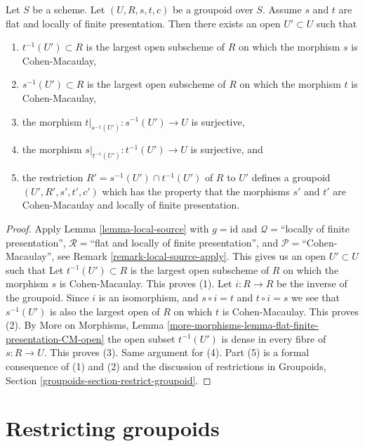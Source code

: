 \begin{lemma}
\label{lemma-make-CM}
Let $S$ be a scheme.
Let $(U, R, s, t, c)$ be a groupoid over $S$.
Assume $s$ and $t$ are flat and locally of finite presentation.
Then there exists an open $U' \subset U$ such that
\begin{enumerate}
\item $t^{-1}(U') \subset R$ is the largest open subscheme of
$R$ on which the morphism $s$ is Cohen-Macaulay,
\item $s^{-1}(U') \subset R$ is the largest open subscheme of
$R$ on which the morphism $t$ is Cohen-Macaulay,
\item the morphism $t|_{s^{-1}(U')} : s^{-1}(U') \to U$ is
surjective,
\item the morphism $s|_{t^{-1}(U')} : t^{-1}(U') \to U$ is
surjective, and
\item the restriction $R' = s^{-1}(U') \cap t^{-1}(U')$
of $R$ to $U'$ defines a groupoid $(U', R', s', t', c')$ which has the property
that the morphisms $s'$ and $t'$ are Cohen-Macaulay and locally of
finite presentation.
\end{enumerate}
\end{lemma}

\begin{proof}
Apply
Lemma \ref{lemma-local-source}
with
$g = \text{id}$ and
$\mathcal{Q} =$``locally of finite presentation'',
$\mathcal{R} =$``flat and locally of finite presentation'', and
$\mathcal{P}=$``Cohen-Macaulay'', see
Remark \ref{remark-local-source-apply}.
This gives us an open $U' \subset U$ such that
Let $t^{-1}(U') \subset R$ is the largest open subscheme of $R$
on which the morphism $s$ is Cohen-Macaulay.
This proves (1).
Let $i : R \to R$ be the inverse of the groupoid.
Since $i$ is an isomorphism, and $s \circ i = t$ and $t \circ i = s$
we see that $s^{-1}(U')$ is also the largest open of $R$ on which $t$ is
Cohen-Macaulay. This proves (2).
By 
More on Morphisms,
Lemma \ref{more-morphisms-lemma-flat-finite-presentation-CM-open}
the open subset $t^{-1}(U')$ is dense in every fibre of $s : R \to U$.
This proves (3). Same argument for (4).
Part (5) is a formal consequence of (1) and (2) and the discussion
of restrictions in
Groupoids, Section \ref{groupoids-section-restrict-groupoid}.
\end{proof}








\section{Restricting groupoids}
\label{section-restricting-groupoids}

